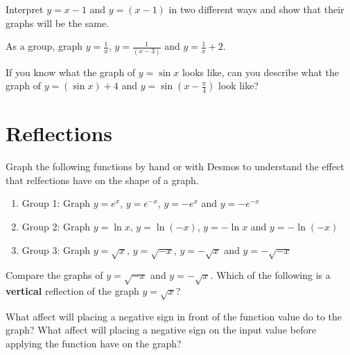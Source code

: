 \documentclass[number]{ximera}
\begin{document}
\begin{question}
Interpret $y = x-1$ and $y = (x-1)$ in two different ways and show that their graphs will be the same.
\end{question}

\begin{problem}
As a group, graph $y = \displaystyle{\frac{1}{x}}$, $y = \displaystyle{\frac{1}{(x-3)}}$ and $y = \displaystyle{\frac{1}{x} + 2}$.
\end{problem}

\begin{question}
If you know what the graph of $y = \sin x$ looks like, can you describe what the graph of $y = (\sin x) + 4$ and $y = \sin (x-\frac{\pi}{4})$ look like?
\end{question}

\section{Reflections}

\begin{problem}
Graph the following functions by hand or with Desmos to understand the effect that relfections have on the shape of a graph.
\begin{enumerate}
\item Group 1: Graph $y = e^x$, $y = e^{-x}$, $y=-e^x$ and $y = -e^{-x}$
\item Group 2: Graph $y = \ln x$, $y = \ln (-x)$, $y = - \ln x$ and $y = - \ln (-x)$
\item Group 3: Graph $y = \sqrt x$, $y = \sqrt {-x}$, $y = - \sqrt x$ and $y = - \sqrt {-x}$
\end{enumerate}
\end{problem}

\begin{question}
Compare the graphs of $y=\sqrt{-x}$ and $y=-\sqrt{x}$. Which of the following is a {\bf vertical} reflection of the graph $y=\sqrt{x}$?
\begin{multipleChoice}
\end{multipleChoice}
\end{question}

\begin{question}
What affect will placing a negative sign in front of the function value do to the graph? What affect will placing a negative sign on the input value before applying the function have on the graph?
\end{question}
\end{document}
